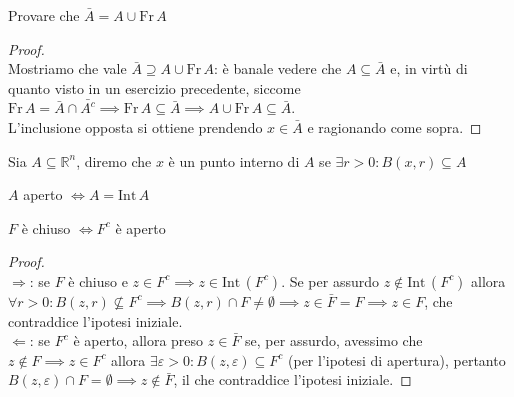 \begin{exercise}
	Provare che $\bar{A} = A \cup \text{Fr} \, A$
\end{exercise}
\begin{proof} \hspace{1cm} \\
	Mostriamo che vale $\bar{A} \supseteq A \cup \text{Fr} \, A$: è banale vedere che $A \subseteq \bar{A}$ e, in virtù di quanto visto in un esercizio precedente, siccome $\text{Fr} \, A = \bar{A} \cap \bar{A^c} \implies \text{Fr} \, A \subseteq \bar{A} \implies A \cup \text{Fr} \, A \subseteq \bar{A}$. \\
	L'inclusione opposta si ottiene prendendo $x \in \bar{A}$ e ragionando come sopra.
\end{proof}
\begin{definition}
	Sia $A \subseteq \mathbb{R}^n$, diremo che $x$ è un punto interno di $A$ se $\exists r > 0: B(x, r) \subseteq A$
\end{definition}
\begin{remark}
$A$ aperto $\iff A = \text{Int} \, A$
\end{remark}
\begin{prop}
$F$ è chiuso $\iff F^c$ è aperto
\end{prop}
\begin{proof} \hspace{1cm} \\
	$\boxed{\Rightarrow}$: se $F$ è chiuso e $z \in F^c \implies z \in \text{Int} \, (F^c)$. Se per assurdo $z \not\in \text{Int} \, (F^c)$ allora $\forall r > 0: B(z, r) \not\subseteq F^c \implies B(z, r) \cap F \neq \emptyset \implies z \in \bar{F} = F \implies z \in F$, che contraddice l'ipotesi iniziale. \\
	$\boxed{\Leftarrow}$: se $F^c$ è aperto, allora preso $z \in \bar{F}$ se, per assurdo, avessimo che $z \not\in F \implies z \in F^c$ allora $\exists \varepsilon > 0: B(z, \varepsilon) \subseteq F^c$ (per l'ipotesi di apertura), pertanto $B(z, \varepsilon) \cap F = \emptyset \implies z \not\in \bar{F}$, il che contraddice l'ipotesi iniziale. 
\end{proof}